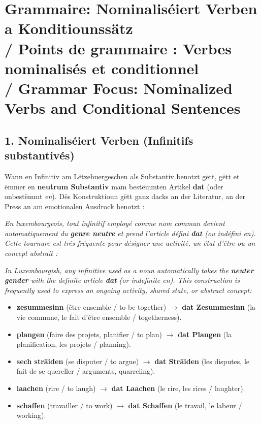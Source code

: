 \vspace{1.5em}

\section[Grammaire / Grammar]{Grammaire: Nominaliséiert Verben a Konditiounssätz \\/ Points de grammaire : Verbes nominalisés et conditionnel \\/ Grammar Focus: Nominalized Verbs and Conditional Sentences}

\subsection[Nominaliséiert Verben / Nominalized Verbs]{1. Nominaliséiert Verben (Infinitifs substantivés)}

Wann en Infinitiv am Lëtzebuergeschen als Substantiv benotzt gëtt, gëtt et ëmmer en \textbf{neutrum Substantiv} mam bestëmmten Artikel \textbf{dat} (oder onbestëmmt \textit{en}). Dës Konstruktioun gëtt ganz dacks an der Literatur, an der Press an am emotionalen Ausdrock benotzt :

\textit{En luxembourgeois, tout infinitif employé comme nom commun devient automatiquement du \textbf{genre neutre} et prend l'article défini \textbf{dat} (ou indéfini \textit{en}). Cette tournure est très fréquente pour désigner une activité, un état d'être ou un concept abstrait :}

\textit{In Luxembourgish, any infinitive used as a noun automatically takes the \textbf{neuter gender} with the definite article \textbf{dat} (or indefinite \textit{en}). This construction is frequently used to express an ongoing activity, shared state, or abstract concept:}

\begin{itemize}
    \item \textbf{zesummesinn} (être ensemble / to be together) $\rightarrow$ \textbf{dat Zesummesinn} (la vie commune, le fait d'être ensemble / togetherness).
    \item \textbf{plangen} (faire des projets, planifier / to plan) $\rightarrow$ \textbf{dat Plangen} (la planification, les projets / planning).
    \item \textbf{sech sträiden} (se disputer / to argue) $\rightarrow$ \textbf{dat Sträiden} (les disputes, le fait de se quereller / arguments, quarreling).
    \item \textbf{laachen} (rire / to laugh) $\rightarrow$ \textbf{dat Laachen} (le rire, les rires / laughter).
    \item \textbf{schaffen} (travailler / to work) $\rightarrow$ \textbf{dat Schaffen} (le travail, le labeur / working).
\end{itemize}


